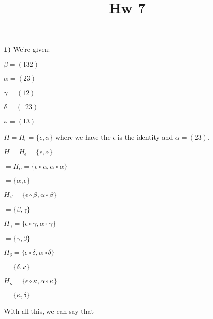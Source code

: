\documentclass{article}
\title {Hw 7}
\date{}
\begin{document}
\maketitle

\textbf{1)}  We're given:  

\medskip

$\beta=(132)$

\medskip

$\alpha=(23)$

\medskip


$\gamma=(12)$

\medskip

$\delta=(123)$

\medskip

$\kappa=(13)$

\medskip

$H=H_{\epsilon}=\{\epsilon, \alpha \}$ where we have the $\epsilon$ is the identity and $\alpha=(23)$.

\medskip

$H=H_{\epsilon}=\{\epsilon, \alpha\}$


\medskip

\hspace{.11in} $=H_{\alpha}=\{\epsilon \circ \alpha, \alpha \circ \alpha \}$

\hspace{.48in} $=\{ \alpha, \epsilon \}$

\medskip

$H_{\beta}=\{\epsilon \circ \beta, \alpha \circ \beta \}$

\hspace{.18in} $=\{\beta, \gamma\}$

\medskip 

$H_{\gamma}=\{\epsilon \circ \gamma, \alpha \circ \gamma \}$

\hspace{.18in} $=\{\gamma, \beta\}$

\medskip

$H_{\delta}=\{\epsilon \circ \delta, \alpha \circ \delta \}$

\hspace{.18in} $=\{\delta, \kappa\}$

\medskip

$H_{\kappa}=\{\epsilon \circ \kappa, \alpha \circ \kappa \}$

\hspace{.18in} $=\{\kappa, \delta\}$

\medskip

With all this, we can say that 
\end{document}
